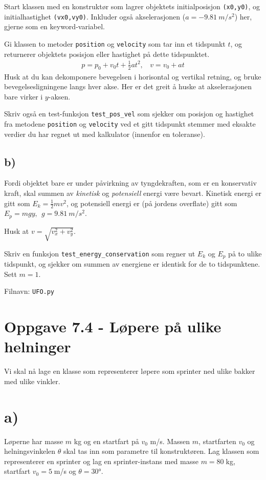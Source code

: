 \documentclass[10pt,a4paper]{article}
\newcommand{\half}{\frac{1}{2}}
\begin{document}
Start klassen med en konstruktør som lagrer objektets initialposisjon \texttt{(x0,y0)}, og initialhastighet \texttt{(vx0,vy0)}. Inkluder også akselerasjonen ($a=\SI{-9.81}{m/s^2}$) her, gjerne som en keyword-variabel.
 
Gi klassen to metoder \texttt{position} og \texttt{velocity} som tar inn et tidspunkt $t$, og returnerer objektets posisjon eller hastighet på dette tidspunktet.
\begin{align*}
p = p_0 + v_0t + \half at^2, \ \ \ \ v = v_0 + at
\end{align*}
Husk at du kan dekomponere bevegelsen i horisontal og vertikal retning, og bruke bevegelsesligningene langs hver akse. Her er det greit å huske at akselerasjonen bare virker i $y$-aksen.
 
Skriv også en test-funksjon \texttt{test\_pos\_vel} som sjekker om posisjon og hastighet fra metodene \texttt{position} og \texttt{velocity} ved et gitt tidspunkt stemmer med eksakte verdier du har regnet ut med kalkulator (innenfor en toleranse).
 
\subsection*{b)}
Fordi objektet bare er under påvirkning av tyngdekraften, som er en konservativ kraft, skal summen av \textit{kinetisk} og \textit{potensiell} energi være bevart. Kinetisk energi er gitt som $E_k = \half m v^2$, og potensiell energi er (på jordens overflate) gitt som $E_p = mgy, \ \ g=\SI{9.81}{m/s^2}$.

Husk at $v = \sqrt{v_x^2 + v_y^2}$.

Skriv en funksjon \texttt{test\_energy\_conservation} som regner ut $E_k$ og $E_p$ på to ulike tidspunkt, og sjekker om summen av energiene er identisk for de to tidspunktene. Sett $m=1$.
 
Filnavn: \texttt{UFO.py}
 
 
 
\section*{Oppgave 7.4 - Løpere på ulike helninger}
Vi skal nå lage en klasse som representerer løpere som sprinter ned ulike bakker med ulike vinkler. 
 
\section*{a)}
Løperne har masse $m$ kg og en startfart på $v_0$ m/s. Massen $m$, startfarten $v_0$ og helningsvinkelen $\theta$ skal tas inn som parametre til konstruktøren. Lag klassen som representerer en sprinter og lag en sprinter-instans med masse $m = 80\;$kg, startfart $v_0 = 5\;$m/s og $\theta = \ang{30}$. 
 
\end{document}
